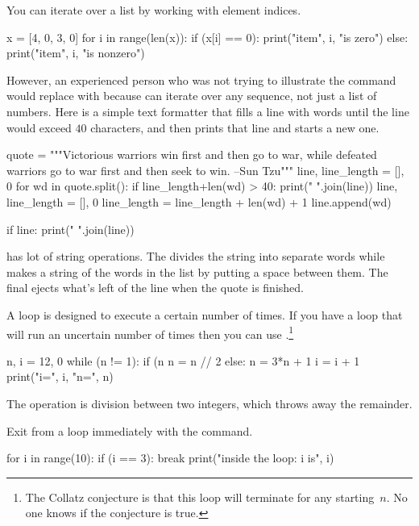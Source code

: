 You can iterate over a list by working with element indices.
\begin{pythonconsole}
x = [4, 0, 3, 0]
for i in range(len(x)):
    if (x[i] == 0):
        print("item", i, "is zero")
    else:
        print("item", i, "is nonzero")

\end{pythonconsole}
However, an experienced  \python{} person who was not trying to illustrate 
the  command
would replace 
with  because
 can iterate over any sequence, not just
a list of numbers.
Here is a simple text formatter that fills a line with words until
the line would exceed $40$ characters, and then
prints that line and starts a new one.
\begin{pythonconsole}
quote = """Victorious warriors win first and then go to war, 
while defeated warriors go to war first and then seek to win. 
--Sun Tzu"""
line, line_length = [], 0
for wd in quote.split():
    if line_length+len(wd) > 40:
        print(" ".join(line))
        line, line_length = [], 0
    line_length = line_length + len(wd) + 1
    line.append(wd)

if line:
    print(" ".join(line))

\end{pythonconsole}
\python{} has lot of string operations.
The  divides the string into separate words while
 makes a string of the words in the list 
 by putting a space between them.
The final  ejects what's left of the line
when the quote is finished.

A  loop is designed to execute a certain
number of times.
If you have a loop that will run an uncertain number of times then
you can use .\footnote{%
  The Collatz conjecture is 
  that this loop will 
  terminate for any starting~$n$.
  No one knows if the conjecture is true.}
\begin{pythonconsole}
n, i = 12, 0
while (n != 1):
    if (n %
        n = n // 2
    else:
        n = 3*n + 1
    i = i + 1
    print("i=", i, "n=", n)

\end{pythonconsole}
The \inlinecode{//} operation is division between two integers, which
throws away the remainder.

Exit from a loop immediately with the  command.
\begin{pythonconsole}
for i in range(10):
    if (i == 3):
        break
    print("inside the loop: i is", i)

\end{pythonconsole}

